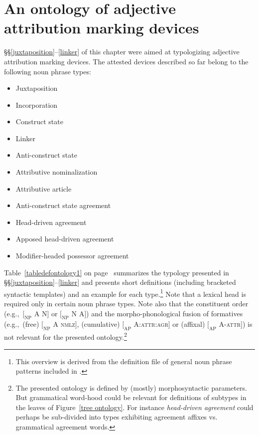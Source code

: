 \section[Ontology of attribution marking]{An ontology of adjective attribution marking devices}\label{ontol}
\S\S\ref{juxtaposition}–\ref{linker} of this chapter were aimed at typologizing adjective attribution marking devices. The attested devices described so far belong to the following noun phrase types:
\begin{itemize}
\item{Juxtaposition}
\item{Incorporation}
\item{Construct state}
\item{Linker}
\item{Anti\hyp{}construct state}
\item{Attributive nominalization}
\item{Attributive article}
\item{Anti\hyp{}construct state agreement}
\item{Head\hyp{}driven agreement}
\item{Apposed head\hyp{}driven agreement}
\item{Modifier\hyp{}headed possessor agreement}
\end{itemize}
Table~\ref{tabledefontology1} on page~\pageref{tabledefontology1} summarizes the typology presented in \S\S\ref{juxtaposition}–\ref{linker} and presents short definitions (including bracketed syntactic templates) and an example for each type.\footnote{This overview is derived from the definition file of general noun phrase patterns included in \citet{AUTOTYP-NP}.} Note that a lexical head is required only in certain noun phrase types. Note also that the constituent order (e.g.,~$[_\textrm{NP}$ A N$]$ or $[_\textrm{NP}$ N A$]$) and the morpho-phonological fusion of formatives (e.g.,~(free) $[_\textrm{NP}$ A \textsc{nmlz}$]$, (cumulative) $[_\textrm{AP}$ A:\textsc{attr:agr}$]$ or (affixal) $[_\textrm{AP}$ A-\textsc{attr}$]$) is not relevant for the presented ontology.\footnote{The presented ontology is defined by (mostly) morphosyntactic parameters. But grammatical word-hood could be relevant for definitions of subtypes in the leaves of Figure~\ref{tree ontology}. For instance \textit{head\hyp{}driven agreement} could perhaps be sub-divided into types exhibiting agreement affixes vs. grammatical agreement words.}

